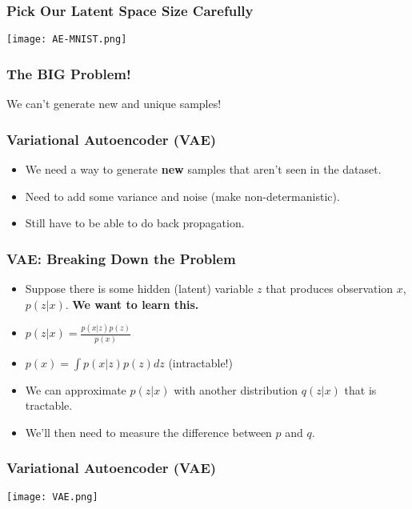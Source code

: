 \begin{frame}
    \frametitle{Pick Our Latent Space Size Carefully}
    \texttt{[image: AE-MNIST.png]}
\end{frame}

\begin{frame}
    \frametitle{The BIG Problem!}
    \center We can't generate new and unique samples!
\end{frame}

\begin{frame}
    \frametitle{Variational Autoencoder (VAE)}
    \begin{itemize}
        \item We need a way to generate \textbf{new} samples that aren't seen in
            the dataset.
        \item Need to add some variance and noise (make non-determanistic).
        \item Still have to be able to do back propagation.
    \end{itemize}
\end{frame}

\begin{frame}
    \frametitle{VAE: Breaking Down the Problem}
    \begin{itemize}
        \item<1-> Suppose there is some hidden (latent) variable $z$ that produces
            observation $x$, $p(z|x)$. \textbf{We want to learn this.}
        \item<2-> $p(z|x) = \frac{p(x|z)p(z)}{p(x)}$
        \item<3-> $p(x) = \int p(x|z)p(z)dz$ (intractable!)
        \item<4-> We can approximate $p(z|x)$ with another distribution $q(z|x)$
            that is tractable.
        \item<5-> We'll then need to measure the difference between $p$ and $q$.
    \end{itemize}
\end{frame}

\begin{frame}
    \frametitle{Variational Autoencoder (VAE)}
    \texttt{[image: VAE.png]}
\end{frame}

